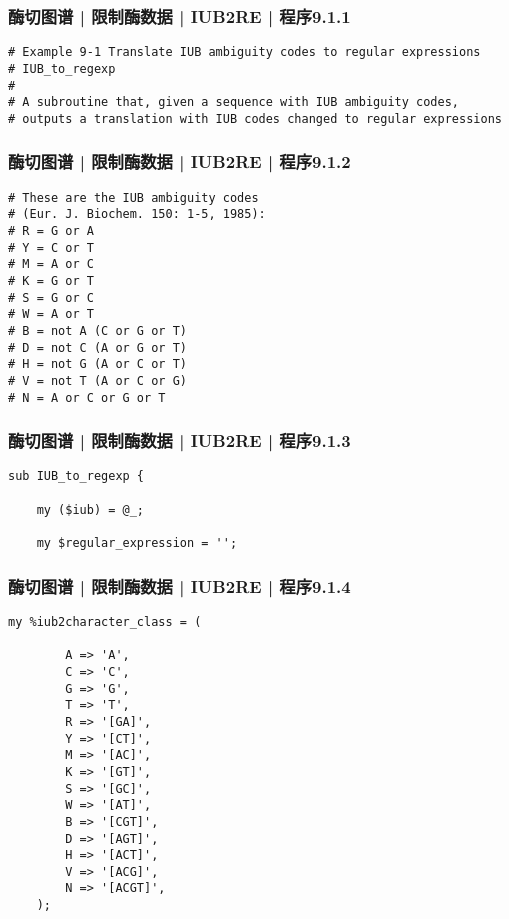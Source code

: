 \begin{frame}[fragile]
  \frametitle{酶切图谱 | 限制酶数据 | IUB2RE | 程序9.1.1}
  \vspace{-1.5em}
\begin{lstlisting}
# Example 9-1 Translate IUB ambiguity codes to regular expressions
# IUB_to_regexp
#
# A subroutine that, given a sequence with IUB ambiguity codes,
# outputs a translation with IUB codes changed to regular expressions
\end{lstlisting}
\end{frame}

\begin{frame}[fragile]
  \frametitle{酶切图谱 | 限制酶数据 | IUB2RE | 程序9.1.2}
  \vspace{-1.5em}
\begin{lstlisting}[firstnumber=7]
# These are the IUB ambiguity codes
# (Eur. J. Biochem. 150: 1-5, 1985):
# R = G or A
# Y = C or T
# M = A or C
# K = G or T
# S = G or C
# W = A or T
# B = not A (C or G or T)
# D = not C (A or G or T)
# H = not G (A or C or T)
# V = not T (A or C or G)
# N = A or C or G or T
\end{lstlisting}
\end{frame}

\begin{frame}[fragile]
  \frametitle{酶切图谱 | 限制酶数据 | IUB2RE | 程序9.1.3}
  \vspace{-1.5em}
\begin{lstlisting}[firstnumber=21]
sub IUB_to_regexp {

    my ($iub) = @_;

    my $regular_expression = '';
\end{lstlisting}
\end{frame}

\begin{frame}[fragile]
  \frametitle{酶切图谱 | 限制酶数据 | IUB2RE | 程序9.1.4}
  \vspace{-1.5em}
\begin{lstlisting}[firstnumber=27,basicstyle=\small\tt,numberstyle=\footnotesize]
    my %iub2character_class = (

        A => 'A',
        C => 'C',
        G => 'G',
        T => 'T',
        R => '[GA]',
        Y => '[CT]',
        M => '[AC]',
        K => '[GT]',
        S => '[GC]',
        W => '[AT]',
        B => '[CGT]',
        D => '[AGT]',
        H => '[ACT]',
        V => '[ACG]',
        N => '[ACGT]',
    );
\end{lstlisting}
\end{frame}

